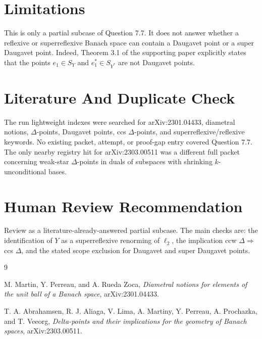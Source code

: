 \documentclass[11pt]{article}
\newcommand{\ellTwo}{\ell_2}
\begin{document}
\section*{Limitations}

This is only a partial subcase of Question 7.7.  It does not answer whether a
reflexive or superreflexive Banach space can contain a Daugavet point or a
super Daugavet point.  Indeed, Theorem 3.1 of the supporting paper explicitly
states that the points \(e_1\in S_Y\) and \(e_1^*\in S_{Y^*}\) are not
Daugavet points.

\section*{Literature And Duplicate Check}

The run lightweight indexes were searched for arXiv:2301.04433, diametral
notions, \(\Delta\)-points, Daugavet points, ccs \(\Delta\)-points, and
superreflexive/reflexive keywords.  No existing packet, attempt, or proof-gap
entry covered Question 7.7.  The only nearby registry hit for arXiv:2303.00511
was a different full packet concerning weak-star \(\Delta\)-points in duals of
subspaces with shrinking \(k\)-unconditional bases.

\section*{Human Review Recommendation}

Review as a literature-already-answered partial subcase.  The main checks are:
the identification of \(Y\) as a superreflexive renorming of \(\ellTwo\), the
implication ccw \(\Delta\Rightarrow\) ccs \(\Delta\), and the stated scope
exclusion for Daugavet and super Daugavet points.

\begin{thebibliography}{9}

M. Martin, Y. Perreau, and A. Rueda Zoca,
\emph{Diametral notions for elements of the unit ball of a Banach space},
arXiv:2301.04433.

T. A. Abrahamsen, R. J. Aliaga, V. Lima, A. Martiny, Y. Perreau,
A. Prochazka, and T. Veeorg,
\emph{Delta-points and their implications for the geometry of Banach spaces},
arXiv:2303.00511.

\end{thebibliography}
\end{document}
